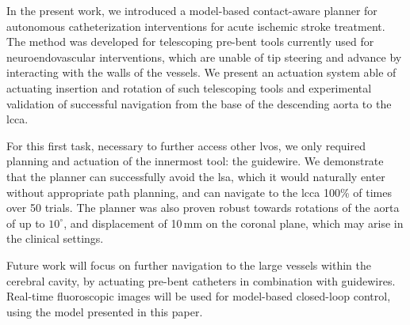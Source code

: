 In the present work, we introduced a model-based contact-aware planner for autonomous catheterization interventions for acute ischemic stroke treatment. The method was developed for telescoping pre-bent tools currently used for neuroendovascular interventions, which are unable of tip steering and advance by interacting with the walls of the vessels. We present an actuation system able of actuating insertion and rotation of such telescoping tools and experimental validation of successful navigation from the base of the descending aorta to the \gls{lcca}.

For this first task, necessary to further access other \glspl{lvo}, we only required planning and actuation of the innermost tool: the guidewire. We demonstrate that the planner can successfully avoid the \gls{lsa}, which it would naturally enter without appropriate path planning, and can navigate to the \gls{lcca} 100\% of times over 50 trials. The planner was also proven robust towards rotations of the aorta of up to $10^\circ$, and displacement of 10\,mm on the coronal plane, which may arise in the clinical settings.

Future work will focus on further navigation to the large vessels within the cerebral cavity, by actuating pre-bent catheters in combination with guidewires. Real-time fluoroscopic images will be used for model-based closed-loop control, using the model presented in this paper.